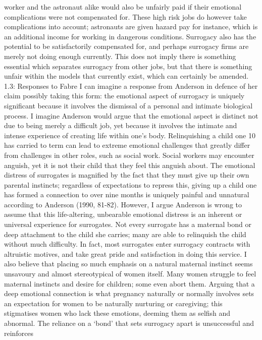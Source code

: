 worker and the astronaut alike would also be unfairly paid if their
emotional complications were not compensated for. These high risk jobs
do however take complications into account; astronauts are given hazard
pay for instance, which is an additional income for working in dangerous
conditions. Surrogacy also has the potential to be satisfactorily
compensated for, and perhaps surrogacy firms are merely not doing enough
currently. This does not imply there is something essential which
separates surrogacy from other jobs, but that there is something unfair
within the models that currently exist, which can certainly be amended.
1.3: Responses to Fabre I can imagine a response from Anderson in
defence of her claim possibly taking this form: the emotional aspect of
surrogacy is uniquely significant because it involves the dismissal of a
personal and intimate biological process. I imagine Anderson would argue
that the emotional aspect is distinct not due to being merely a
difficult job, yet because it involves the intimate and intense
experience of creating life within one's body. Relinquishing a child one
10 has carried to term can lead to extreme emotional challenges that
greatly differ from challenges in other roles, such as social work.
Social workers may encounter anguish, yet it is not their child that
they feel this anguish about. The emotional distress of surrogates is
magnified by the fact that they must give up their own parental
instincts; regardless of expectations to repress this, giving up a child
one has formed a connection to over nine months is uniquely painful and
unnatural according to Anderson (1990, 81-82). However, I argue Anderson
is wrong to assume that this life-altering, unbearable emotional
distress is an inherent or universal experience for surrogates. Not
every surrogate has a maternal bond or deep attachment to the child she
carries; many are able to relinquish the child without much difficulty.
In fact, most surrogates enter surrogacy contracts with altruistic
motives, and take great pride and satisfaction in doing this service. I
also believe that placing so much emphasis on a natural maternal
instinct seems unsavoury and almost stereotypical of women itself. Many
women struggle to feel maternal instincts and desire for children; some
even abort them. Arguing that a deep emotional connection is what
pregnancy naturally or normally involves sets an expectation for women
to be naturally nurturing or caregiving; this stigmatises women who lack
these emotions, deeming them as selfish and abnormal. The reliance on a
`bond' that sets surrogacy apart is unsuccessful and reinforces
